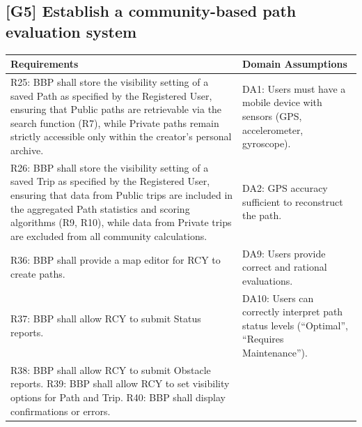 \subsection*{[G5] Establish a community-based path evaluation system}
\begin{longtable}{|L{0.47\textwidth}|L{0.47\textwidth}|}
\hline
\textbf{Requirements} & \textbf{Domain Assumptions} \\ \hline
R25: BBP shall store the visibility setting of a saved Path as specified by the Registered User, ensuring that Public paths are retrievable via the search function (R7), while Private paths remain strictly accessible only within the creator’s personal archive. & DA1: Users must have a mobile device with sensors (GPS, accelerometer, gyroscope). \\ \hline
R26: BBP shall store the visibility setting of a saved Trip as specified by the Registered User, ensuring that data from Public trips are included in the aggregated Path statistics and scoring algorithms (R9, R10), while data from Private trips are excluded from all community calculations. & DA2: GPS accuracy sufficient to reconstruct the path. \\ \hline
R36: BBP shall provide a map editor for RCY to create paths. & DA9: Users provide correct and rational evaluations. \\ \hline
R37: BBP shall allow RCY to submit Status reports. & DA10: Users can correctly interpret path status levels (“Optimal”, “Requires Maintenance”). \\ \hline
R38: BBP shall allow RCY to submit Obstacle reports. 
R39: BBP shall allow RCY to set visibility options for Path and Trip. 
R40: BBP shall display confirmations or errors. & \\ \hline

\end{longtable}

